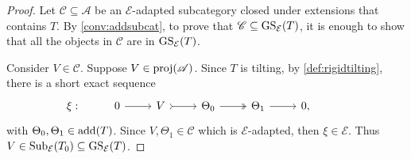 \begin{proof}
Let $\mathscr{C} \subseteq \mathscr{A}$ be an $\mathcal{E}$-adapted subcategory closed under extensions that contains $T$. By \cref{conv:addsubcat}, to prove that $\mathscr{C} \subseteq \operatorname{GS}_\mathcal{E}(T)$, it is enough to show that all the objects in $\mathscr{C}$ are in $\operatorname{GS}_\mathcal{E}(T)$. 

Consider $V \in \mathscr{C}$. Suppose $V \in \operatorname{proj}(\mathscr{A})$. Since $T$ is tilting, by \cref{def:rigidtilting}, there is a short exact sequence 
\[\begin{tikzcd}
	\xi: & 0 & V & \Theta_0 & \Theta_1 &  0, & 
	\arrow[from=1-2, to=1-3]
	\arrow[tail, from=1-3, to=1-4]
	\arrow[two heads,from=1-4, to=1-5]
	\arrow[from=1-5, to=1-6]
\end{tikzcd}\] with $\Theta_0,\Theta_1 \in \operatorname{add}(T)$.
Since $V,\Theta_1 \in \mathscr{C}$ which is $\mathcal{E}$-adapted, then $\xi \in \mathcal{E}$. Thus $V \in \operatorname{Sub}_\mathcal{E}(T_0) \subseteq \operatorname{GS}_\mathcal{E}(T)$.


\end{proof}
